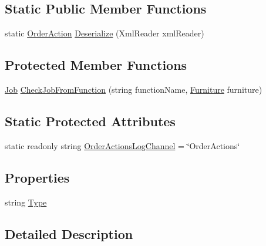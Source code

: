 \subsection*{Static Public Member Functions}
\begin{DoxyCompactItemize}
\item 
static \hyperlink{class_project_porcupine_1_1_order_actions_1_1_order_action}{Order\+Action} \hyperlink{class_project_porcupine_1_1_order_actions_1_1_order_action_aa1cfcbdc5167f3038e0804cfa97a88fb}{Deserialize} (Xml\+Reader xml\+Reader)
\end{DoxyCompactItemize}
\subsection*{Protected Member Functions}
\begin{DoxyCompactItemize}
\item 
\hyperlink{class_job}{Job} \hyperlink{class_project_porcupine_1_1_order_actions_1_1_order_action_a98ff3dd3a2e26196bfd5ab6515a39bf5}{Check\+Job\+From\+Function} (string function\+Name, \hyperlink{class_furniture}{Furniture} furniture)
\end{DoxyCompactItemize}
\subsection*{Static Protected Attributes}
\begin{DoxyCompactItemize}
\item 
static readonly string \hyperlink{class_project_porcupine_1_1_order_actions_1_1_order_action_a9fae61c3d49ebe1483f910c7bebd0dfa}{Order\+Actions\+Log\+Channel} = \char`\"{}Order\+Actions\char`\"{}
\end{DoxyCompactItemize}
\subsection*{Properties}
\begin{DoxyCompactItemize}
\item 
string \hyperlink{class_project_porcupine_1_1_order_actions_1_1_order_action_a318df761797288d96aeb1a9a70064474}{Type}
\end{DoxyCompactItemize}


\subsection{Detailed Description}


